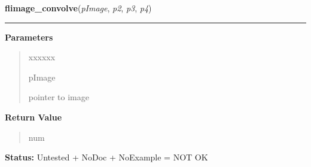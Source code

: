     \label{xformslib:library:flimage_convolve}

    \vspace{0.5ex}

\hspace{.8\funcindent}\begin{boxedminipage}{\funcwidth}

    \raggedright \textbf{flimage\_convolve}(\textit{pImage}, \textit{p2}, \textit{p3}, \textit{p4})

    \vspace{-1.5ex}

    \rule{\textwidth}{0.5\fboxrule}
\setlength{\parskip}{2ex}
\setlength{\parskip}{1ex}
      \textbf{Parameters}
      \vspace{-1ex}

      \begin{quote}
        \begin{Ventry}{xxxxxx}

          \item[pImage]

          pointer to image

        \end{Ventry}

      \end{quote}

      \textbf{Return Value}
    \vspace{-1ex}

      \begin{quote}
      num

      \end{quote}

\textbf{Status:} Untested + NoDoc + NoExample = NOT OK



    \end{boxedminipage}

    \label{xformslib:library:flimage_convolvea}

    \vspace{0.5ex}

